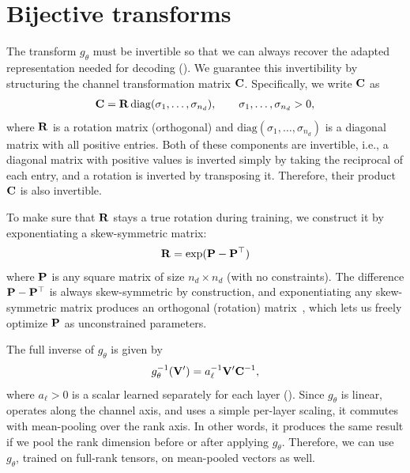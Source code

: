 \section{Bijective transforms}
\label{app:bijective}

The transform $g_\theta$ must be invertible so that we can always recover the adapted representation needed for decoding (). We guarantee this invertibility by structuring the channel transformation matrix ${\mathbf{C}}$. Specifically, we write ${\mathbf{C}}$ as
\begin{align}
   \label{eq:c-factor}
   {\mathbf{C}} = {\mathbf{R}} \, \mathrm{diag}(\sigma_1, \ldots, \sigma_{n_d}),
   \qquad \sigma_1, \ldots, \sigma_{n_d} > 0,
\end{align}
where ${\mathbf{R}}$ is a rotation matrix (orthogonal) and $\mathrm{diag}(\sigma_1,\ldots,\sigma_{n_d})$ is a diagonal matrix with all positive entries. Both of these components are invertible, i.e., a diagonal matrix with positive values is inverted simply by taking the reciprocal of each entry, and a rotation is inverted by transposing it. Therefore, their product ${\mathbf{C}}$ is also invertible.

To make sure that ${\mathbf{R}}$ stays a true rotation during training, we construct it by exponentiating a skew-symmetric matrix:
\begin{align}
   \label{eq:q-expm}
   {\mathbf{R}} = \exp({\mathbf{P}} - {\mathbf{P}}^{\top})
\end{align}
where ${\mathbf{P}}$ is any square matrix of size $n_d \times n_d$ (with no constraints). The difference ${\mathbf{P}} - {\mathbf{P}}^{\top}$ is always skew-symmetric by construction, and exponentiating any skew-symmetric matrix produces an orthogonal (rotation) matrix~\citep{lezcano2019cheap}, which lets us freely optimize ${\mathbf{P}}$ as unconstrained parameters.

The full inverse of $g_\theta$ is given by
\begin{align}
   \label{eq:transform-inverse}
   g_\theta^{-1}({\mathbf{V}}') = a_\ell^{-1} {\mathbf{V}}' {\mathbf{C}}^{-1},
\end{align}
where $a_\ell > 0$ is a scalar learned separately for each layer (). Since $g_\theta$ is linear, operates along the channel axis, and uses a simple per-layer scaling, it commutes with mean-pooling over the rank axis.
In other words, it produces the same result if we pool the rank dimension before or after applying $g_\theta$. Therefore, we can use $g_\theta$, trained on full-rank tensors, on mean-pooled vectors as well.

